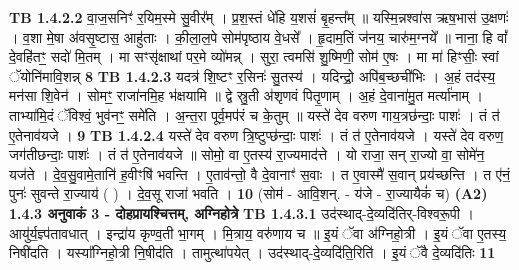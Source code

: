 \documentclass[17pt]{extarticle}
\begin{document}
                  \newline
                                \textbf{ TB 1.4.2.2} \newline
                  वा॒ज॒सनिꣳ॑ र॒यिम॒स्मे सु॒वीर᳚म् । प्र॒श॒स्तं धे॑हि य॒शसं॑ बृ॒हन्त᳚म् ॥ यस्मि॒न्नश्वा॑स ऋष॒भास॑ उ॒क्षणः॑ । व॒शा मे॒षा अ॑वसृ॒ष्टास॒ आहु॑ताः । की॒ला॒ल॒पे सोम॑पृष्ठाय वे॒धसे᳚ । हृ॒दाम॒तिं ज॑नय॒ चारु॑म॒ग्नये᳚ ॥ नाना॒ हि वां᳚ दे॒वहि॑तꣳ॒॒ सदो॑ मि॒तम् । मा सꣳसृ॑क्षाथां पर॒मे व्यो॑मन्न् । सुरा॒ त्वमसि॑ शु॒ष्मिणी॒ सोम॑ ए॒षः । मा मा॑ हिꣳसीः॒ स्वां ॅयोनि॑मावि॒शन्न् \textbf{ 8} \newline
                  \newline
                                \textbf{ TB 1.4.2.3} \newline
                  यदत्र॑ शि॒ष्टꣳ र॒सिनः॑ सु॒तस्य॑ । यदिन्द्रो॒ अपि॑ब॒च्छची॑भिः । अ॒हं तद॑स्य॒ मन॑सा शि॒वेन॑ । सोमꣳ॒॒ राजा॑नमि॒ह भ॑क्षयामि ॥ द्वे स्रु॒ती अ॑शृणवं पितृ॒णाम् । अ॒हं दे॒वाना॑मु॒त मर्त्या॑नाम् । ताभ्या॑मि॒दं ॅविश्वं॒ भुव॑नꣳ॒॒ समे॑ति । अ॒न्त॒रा पूर्व॒मप॑रं च के॒तुम् ॥ यस्ते॑ देव वरुण गाय॒त्रछ॑न्दाः॒ पाशः॑ । तं त॑ ए॒तेनाव॑यजे । \textbf{ 9} \newline
                  \newline
                                \textbf{ TB 1.4.2.4} \newline
                  यस्ते॑ देव वरुण त्रि॒ष्टुप्छ॑न्दाः॒ पाशः॑ । तं त॑ ए॒तेनाव॑यजे । यस्ते॑ देव वरुण॒ जग॑तीछन्दाः॒ पाशः॑ । तं त॑ ए॒तेनाव॑यजे ॥ सोमो॒ वा ए॒तस्य॑ रा॒ज्यमाद॑त्ते । यो राजा॒ सन् रा॒ज्यो वा॒ सोमे॑न॒ यज॑ते । दे॒व॒सु॒वामे॒तानि॑ ह॒वीꣳषि॑ भवन्ति । ए॒ताव॑न्तो॒ वै दे॒वानाꣳ॑ स॒वाः । त ए॒वास्मै॑ स॒वान् प्रय॑च्छन्ति । त ए॑नं॒ पुनः॑ सुवन्ते रा॒ज्याय॑ ( ) । दे॒व॒सू राजा॑ भवति । \textbf{ 10} \newline
                  \newline
                                    (सोम॑ - आवि॒शन्. - य॑जे - रा॒ज्यायैकं॑ च) \textbf{(A2)} \newline \newline
                \textbf{ 1.4.3      अनुवाकं   3 - दोहप्रायश्चित्तम्, अग्निहोत्रे} \newline
                                \textbf{ TB 1.4.3.1} \newline
                  उद॑स्थाद्-दे॒व्यदि॑तिर्-विश्वरू॒पी । आयु॑र्य॒ज्ञ्प॑तावधात् । इन्द्रा॑य कृण्व॒ती भा॒गम् । मि॒त्राय॒ वरु॑णाय च ॥ इ॒यं ॅवा अ॑ग्निहो॒त्री । इ॒यं ॅवा ए॒तस्य॒ निषी॑दति । यस्या᳚ग्निहो॒त्री नि॒षीद॑ति । तामुत्था॑पयेत् । उद॑स्थाद्-दे॒व्यदि॑ति॒रिति॑ । इ॒यं ॅवै दे॒व्यदि॑तिः \textbf{ 11} \newline
\end{document}
